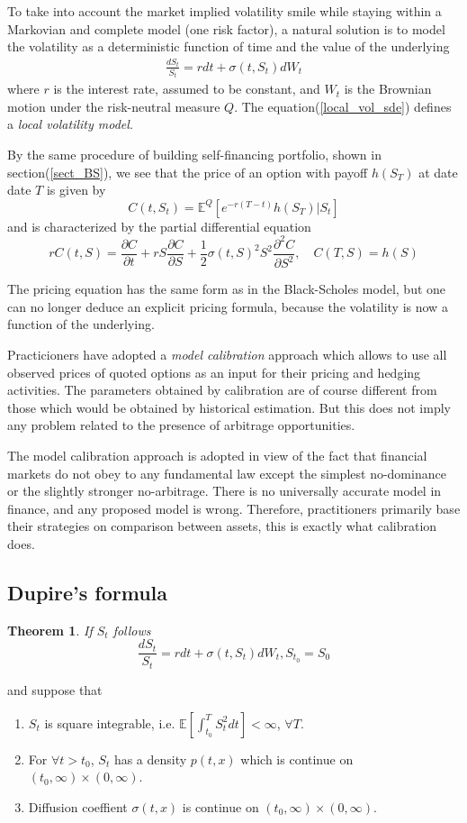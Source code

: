 \documentclass[10pt]{article}
\theoremstyle{plain}
\newtheorem{theorem}{Theorem}[section]
\numberwithin{equation}{section}
\numberwithin{table}{section}
\newcommand{\s}{\sigma}
\newcommand{\pa}{\partial}
\newcommand{\E}{\mathbb{E}}
\begin{document}
To take
into account the market implied volatility smile while staying within a Markovian
and complete model (one risk factor), a natural solution is to model the
volatility as a deterministic function of time and the value of the underlying
\begin{eqnarray}
  \frac{dS_t}{S_t} = rdt + \s(t, S_t)dW_t  
  \label{local_vol_sde}
\end{eqnarray}
where $r$ is the interest rate, assumed to be constant, and $W_t$ is the Brownian motion
under the risk-neutral measure $Q$. The equation(\ref{local_vol_sde}) defines a \emph{local volatility
model}.


By the same procedure of building self-financing portfolio, shown in section(\ref{sect_BS}), we see that the price of an option with payoff $h(S_T)$ at date date $T$ is given by 
\[
    C(t,S_t) = \E^Q [ e^{-r(T-t)}h(S_T) \vert S_t  ]    
\]
and is characterized by the partial differential equation
\[
    rC(t,S) = \frac{\pa C}{\pa t} +rS\frac{\pa C}{\pa S} + \frac{1}{2} \s(t,S)^2 S^2 \frac{\pa^2 C}{\pa S^2}, \quad C(T,S)=h(S)    
\]

The pricing equation has the same form
as in the Black-Scholes model, but one can no longer deduce an explicit pricing
formula, because the volatility is now a function of the underlying.


Practicioners have adopted a \emph{model calibration} approach which allows
to use all observed prices of quoted options as an input for their pricing and
hedging activities. The parameters
obtained by calibration are of course different from those which would be
obtained by historical estimation. But this does not imply any problem related
to the presence of arbitrage opportunities.


The model calibration approach is adopted in view of the fact that financial
markets do not obey to any fundamental law except the simplest no-dominance
or the slightly stronger no-arbitrage. There is no universally
accurate model in finance, and any proposed model is wrong. Therefore,
practitioners primarily base their strategies on comparison between assets, this
is exactly what calibration does.

\subsection{Dupire's formula}

\begin{theorem}
If $S_t$ follows
\[
    \frac{dS_t}{S_t} = rdt + \s(t, S_t)dW_t, S_{t_0} = S_0      
\]
\end{theorem}
and suppose that
\begin{enumerate}
    \item $S_t$ is square integrable, i.e. $\E [ \int_{t_0}^T S_t^2 dt ] < \infty$, $\forall T$.
    \item For $\forall t > t_0$, $S_t$ has a density $p(t, x)$ which is continue on $(t_0, \infty) \times (0, \infty)$.
    \item Diffusion coeffient $\s(t, x)$ is continue on $(t_0, \infty) \times (0, \infty)$.
\end{enumerate}
\end{document}
